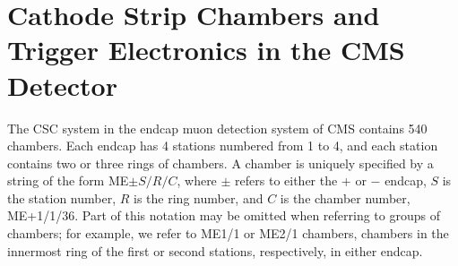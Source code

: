 \section{Cathode Strip Chambers and Trigger Electronics in the CMS Detector}
\label{sec:csc_electronics}

The CSC system in the endcap muon detection system of CMS \cite{Acosta:2002km} contains 540 chambers. Each endcap has 4 stations numbered from 1 to 4, and each station contains two or three rings of chambers. A chamber is uniquely specified by a string of the form ME$\pm S/R/C$, where $\pm$ refers to either the + or $-$ endcap, $S$ is the station number, $R$ is the ring number, and $C$ is the chamber number, \eg ME+1/1/36. Part of this notation may be omitted when referring to groups of chambers; for example, we refer to ME1/1 or ME2/1 chambers, \ie chambers in the innermost ring of the first or second stations, respectively, in either endcap.

